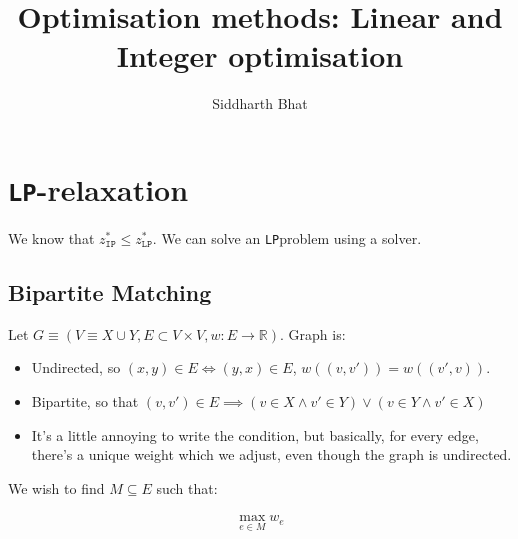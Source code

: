 \documentclass[11pt]{book}
\title{Optimisation methods: Linear and Integer optimisation}
\author{Siddharth Bhat}
\date{}
\newcommand{\ip}{\texttt{IP} }
\newcommand{\lp}{\texttt{LP}}
\newcommand{\R}{\ensuremath{\mathbb{R}}}
\begin{document}
\maketitle
\tableofcontents

\chapter{\lp-relaxation}

We know that $z^*_\ip \leq z^*_\lp$. We can solve an \lp problem using
a solver.

\section{Bipartite Matching}
Let $G \equiv (V \equiv X \cup Y, E \subset V \times V, w: E \rightarrow \R)$. Graph is:
\begin{itemize}
    \item Undirected, so $(x, y) \in E \iff (y, x) \in E$, $w((v, v')) = w((v', v))$.
    \item Bipartite, so that $(v, v') \in E \implies (v \in X \land v'\in Y) \lor (v \in Y \land v' \in X)$
    \item It's a little annoying to write the condition, but basically, for
        every edge, there's a unique weight which we adjust, even though
        the graph is undirected.
\end{itemize}
        
        We wish to find $M \subseteq E$ such that:

\begin{align*}
\max_{e \in M} w_e \\
\end{align*}
\end{document}

